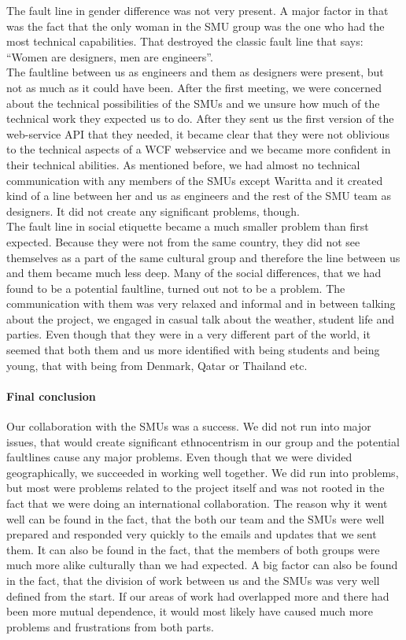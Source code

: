 \documentclass[a4paper,11pt,report]{article}
\begin{document}
{The fault line in gender difference was not very present. A major factor in that was the fact that the only woman in the SMU group was the one who had the most technical capabilities. That destroyed the classic fault line that says: “Women are designers, men are engineers”.\\

The faultline between us as engineers and them as designers were present, but not as much as it could have been. After the first meeting, we were concerned about the technical possibilities of the SMUs and we unsure how much of the technical work they expected us to do. After they sent us the first version of the web-service API that they needed, it became clear that they were not oblivious to the technical aspects of a WCF webservice and we became more confident in their technical abilities. As mentioned before, we had almost no technical communication with any members of the SMUs except Waritta and it created kind of a line between her and us as engineers and the rest of the SMU team as designers. It did not create any significant problems, though. \\

The fault line in social etiquette became a much smaller problem than first expected. Because they were not from the same country, they did not see themselves as a part of the same cultural group and therefore the line between us and them became much less deep. Many of the social differences, that we had found to be a potential faultline, turned out not to be a problem. The communication with them was very relaxed and informal and in between talking about the project, we engaged in casual talk about the weather, student life and parties. Even though that they were in a very different part of the world, it seemed that both them and us more identified with being students and being young, that with being from Denmark, Qatar or Thailand etc.\\

\paragraph{Final conclusion}
Our collaboration with the SMUs was a success. We did not run into major issues, that would create significant ethnocentrism in our group and the potential faultlines cause any major problems. Even though that we were divided geographically, we succeeded in working well together. We did run into problems, but most were problems related to the project itself and was not rooted in the fact that we were doing an international collaboration. The reason why it went well can be found in the fact, that the both our team and the SMUs were well prepared and responded very quickly to the emails and updates that we sent them. It can also be found in the fact, that the members of both groups were much more alike culturally than we had expected. A big factor can also be found in the fact, that the division of work between us and the SMUs was very well defined from the start. If our areas of work had overlapped more and there had been more mutual dependence, it would most likely have caused much more problems and frustrations from both parts. 

}
\end{document}
